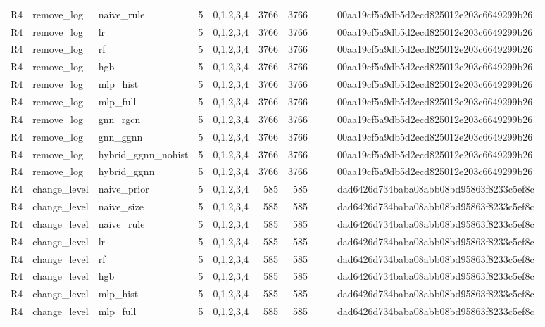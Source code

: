 \begin{table}[htbp]
{\begin{tabular}{lllrrrrrrl}
R4 & remove\_log & naive\_rule & 5 & 0,1,2,3,4 & 3766 & 3766 &  &  & 00aa19cf5a9db5d2ecd825012e203c6649299b26 \\
R4 & remove\_log & lr & 5 & 0,1,2,3,4 & 3766 & 3766 &  &  & 00aa19cf5a9db5d2ecd825012e203c6649299b26 \\
R4 & remove\_log & rf & 5 & 0,1,2,3,4 & 3766 & 3766 &  &  & 00aa19cf5a9db5d2ecd825012e203c6649299b26 \\
R4 & remove\_log & hgb & 5 & 0,1,2,3,4 & 3766 & 3766 &  &  & 00aa19cf5a9db5d2ecd825012e203c6649299b26 \\
R4 & remove\_log & mlp\_hist & 5 & 0,1,2,3,4 & 3766 & 3766 &  &  & 00aa19cf5a9db5d2ecd825012e203c6649299b26 \\
R4 & remove\_log & mlp\_full & 5 & 0,1,2,3,4 & 3766 & 3766 &  &  & 00aa19cf5a9db5d2ecd825012e203c6649299b26 \\
R4 & remove\_log & gnn\_rgcn & 5 & 0,1,2,3,4 & 3766 & 3766 &  &  & 00aa19cf5a9db5d2ecd825012e203c6649299b26 \\
R4 & remove\_log & gnn\_ggnn & 5 & 0,1,2,3,4 & 3766 & 3766 &  &  & 00aa19cf5a9db5d2ecd825012e203c6649299b26 \\
R4 & remove\_log & hybrid\_ggnn\_nohist & 5 & 0,1,2,3,4 & 3766 & 3766 &  &  & 00aa19cf5a9db5d2ecd825012e203c6649299b26 \\
R4 & remove\_log & hybrid\_ggnn & 5 & 0,1,2,3,4 & 3766 & 3766 &  &  & 00aa19cf5a9db5d2ecd825012e203c6649299b26 \\
R4 & change\_level & naive\_prior & 5 & 0,1,2,3,4 & 585 & 585 &  &  & dad6426d734baba08abb08bd95863f8233c5ef8c \\
R4 & change\_level & naive\_size & 5 & 0,1,2,3,4 & 585 & 585 &  &  & dad6426d734baba08abb08bd95863f8233c5ef8c \\
R4 & change\_level & naive\_rule & 5 & 0,1,2,3,4 & 585 & 585 &  &  & dad6426d734baba08abb08bd95863f8233c5ef8c \\
R4 & change\_level & lr & 5 & 0,1,2,3,4 & 585 & 585 &  &  & dad6426d734baba08abb08bd95863f8233c5ef8c \\
R4 & change\_level & rf & 5 & 0,1,2,3,4 & 585 & 585 &  &  & dad6426d734baba08abb08bd95863f8233c5ef8c \\
R4 & change\_level & hgb & 5 & 0,1,2,3,4 & 585 & 585 &  &  & dad6426d734baba08abb08bd95863f8233c5ef8c \\
R4 & change\_level & mlp\_hist & 5 & 0,1,2,3,4 & 585 & 585 &  &  & dad6426d734baba08abb08bd95863f8233c5ef8c \\
R4 & change\_level & mlp\_full & 5 & 0,1,2,3,4 & 585 & 585 &  &  & dad6426d734baba08abb08bd95863f8233c5ef8c \\

\end{tabular}}
\end{table}
